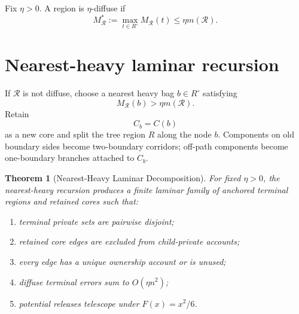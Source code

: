 \documentclass[11pt]{article}
\newtheorem{theorem}{Theorem}[section]
\theoremstyle{definition}
\newcommand{\calR}{\mathcal R}
\begin{document}
Fix \(\eta>0\). A region is \(\eta\)-diffuse if
\[
    M_{\calR}^*
    :=
    \max_{t\in R^\circ}M_{\calR}(t)
    \le
    \eta m(\calR).
\]

\section{Nearest-heavy laminar recursion}

If \(\calR\) is not diffuse, choose a nearest heavy bag \(b\in R^\circ\) satisfying
\[
    M_{\calR}(b)>\eta m(\calR).
\]
Retain
\[
    C_b=C(b)
\]
as a new core and split the tree region \(R\) along the node \(b\). Components on old boundary sides become two-boundary corridors; off-path components become one-boundary branches attached to \(C_b\).

\begin{theorem}[Nearest-Heavy Laminar Decomposition]\label{thm:nearest-heavy}
For fixed \(\eta>0\), the nearest-heavy recursion produces a finite laminar family of anchored terminal regions and retained cores such that:
\begin{enumerate}[label=(\roman*)]
    \item terminal private sets are pairwise disjoint;
    \item retained core edges are excluded from child-private accounts;
    \item every edge has a unique ownership account or is unused;
    \item diffuse terminal errors sum to \(O(\eta n^2)\);
    \item potential releases telescope under \(F(x)=x^2/6\).
\end{enumerate}
\end{theorem}
\end{document}
